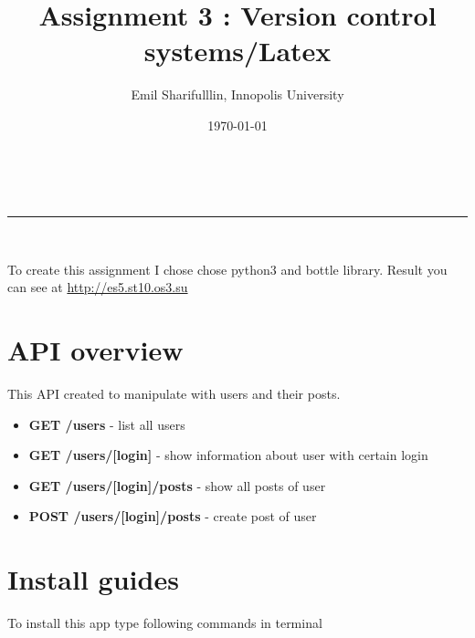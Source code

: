 \documentclass[a4paper,11pt]{article}
\makeatletter
\newcommand*{\TitleFont}{%
      \usefont{\encodingdefault}{\rmdefault}{b}{n}%
      \fontsize{16}{20}%
      \selectfont}
\renewcommand{\maketitle}{
\begin{center}
\vspace{2ex}
{\huge \textsc{\@title}}
\vspace{1ex}
\\
\rule{\linewidth}{0.5pt}\\
\@author \hfill \@date
\vspace{4ex}
\end{center}
}
\makeatother
\begin{document}






\title{ \TitleFont Assignment 3 : Version control systems/Latex }

\author{Emil Sharifulllin, Innopolis University}

\date{\today}

\maketitle

To create this assignment I chose chose python3 and bottle library.
Result you can see at \href{http://es5.st10.os3.su}{http://es5.st10.os3.su}

\section{API overview}
This API created to manipulate with users and their posts. 

\begin{itemize}
  \item \textbf{GET /users} - list all users
  \item \textbf{GET /users/[login]} - show information about user with certain login
  \item \textbf{GET /users/[login]/posts} - show all posts of user
  \item \textbf{POST /users/[login]/posts} - create post of user
\end{itemize}

\section{Install guides}
To install this app type following commands in terminal

\end{document}
